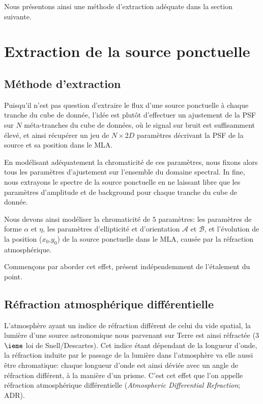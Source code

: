 \documentclass[../main/main.tex]{subfiles}
\begin{document}
Nous présentons ainsi une méthode d'extraction adéquate dans la section suivante. 


\section{Extraction de la source ponctuelle}

\subsection{Méthode d'extraction}\label{ssec:methodextraction}

Puisqu'il n'est pas question d'extraire le flux d'une source ponctuelle
à chaque tranche du cube de donnée, l'idée est plutôt d'effectuer un
ajustement de la PSF sur $N$ méta-tranches du cube de
données, où le signal sur bruit est suffisamment élevé, et ainsi récupérer
un jeu de $N\times2D$ paramètres décrivant la PSF de la source et sa position 
dans le MLA.

En modélisant adéquatement la chromaticité de ces paramètres, nous
fixons alors tous les paramètres d'ajustement sur l'ensemble du domaine
spectral. In fine, nous extrayons le spectre de la source
ponctuelle en ne laissant libre que les paramètres d'amplitude et de
background pour chaque tranche du cube de donnée.

Nous devons ainsi modéliser la chromaticité de $5$ paramètres: les
paramètres de forme $\alpha$ et $\eta$, les paramètres d'ellipticité et
d'orientation $\mathcal{A}$ et $\mathcal{B}$, et l'évolution de la
position ($x_{0}$,$y_{0}$) de la source ponctuelle dans le MLA, causée
par la réfraction atmosphérique.

Commençons par aborder cet effet, présent indépendemment de l'étalement
du point.


\subsection{R\'efraction atmosph\'erique
  diff\'erentielle}\label{ssec:adr}


L'atmosphère ayant un indice de réfraction différent de celui du vide
spatial, la lumière d'une source astronomique nous parvenant sur Terre
est ainsi réfractée (3$\ieme$ loi de Snell/Descartes). Cet indice étant dépendant de la longueur d'onde, la
réfraction induite par le passage de la lumière dans l'atmosphère va
elle aussi être chromatique: chaque longueur d'onde est ainsi déviée
avec un angle de réfraction différent, à la manière d'un prisme. C'est
cet effet que l'on appelle réfraction atmosphérique différentielle
(\textit{Atmospheric Differential Refraction}; ADR).
\end{document}
